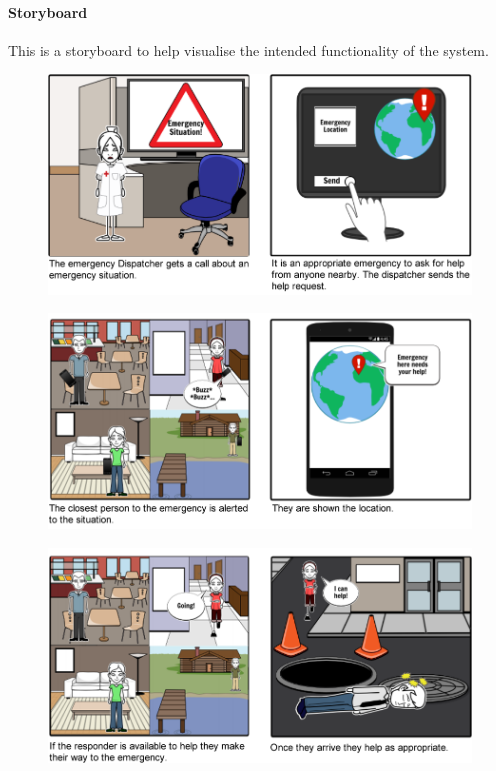 \documentclass{article}
\begin{document}
	\paragraph{Storyboard}
	This is a storyboard to help visualise the intended functionality of the system.
	\begin{figure}[H]
		\centering
		\includegraphics[width=1\textwidth]{"Iteration1/Storyboard - Iteration 0 - 1"}
	\end{figure}
	\begin{figure}[H]
		\centering
		\includegraphics[width=1\textwidth]{"Iteration1/Storyboard - Iteration 0 - 2"}
	\end{figure}
	\begin{figure}[H]
		\centering
		\includegraphics[width=1\textwidth]{"Iteration1/Storyboard - Iteration 0 - 3"}
	\end{figure}
\end{document}
